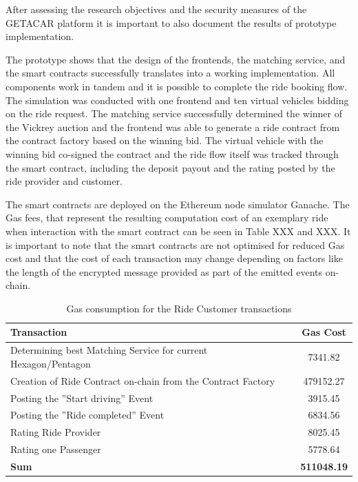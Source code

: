 After assessing  the research objectives and the security measures of the GETACAR platform it is important to also document the results of prototype implementation. 

The prototype shows that the design of the frontends, the matching service, and the smart contracts successfully translates into a working implementation. All components work in tandem and it is possible to complete the ride booking flow. The simulation was conducted with one frontend and ten virtual vehicles bidding on the ride request. The matching service successfully determined the winner of the Vickrey auction and the frontend was able to generate a ride contract from the contract factory based on the winning bid. The virtual vehicle with the winning bid co-signed the contract and the ride flow itself was tracked through the smart contract, including the deposit payout and the rating posted by the ride provider and customer.

The smart contracts are deployed on the Ethereum node simulator Ganache. The Gas fees, that represent the resulting computation cost of an exemplary ride when interaction with the smart contract can be seen in Table XXX and XXX. It is important to note that the smart contracts are not optimised for reduced Gas cost and that the cost of each transaction may change depending on factors like the length of the encrypted message provided as part of the emitted events on-chain.

\begin{table}[H]
\centering
\begin{tabular}{|l|c|}
\hline
\textbf{Transaction} & \textbf{Gas Cost} \\
\hline
Determining best Matching Service for current Hexagon/Pentagon & 7341.82 \\
\hline
Creation of Ride Contract on-chain from the Contract Factory& 479152.27 \\
\hline
Posting the ''Start driving'' Event& 3915.45 \\
\hline
Posting the ''Ride completed'' Event & 6834.56 \\
\hline
Rating Ride Provider & 8025.45 \\
\hline
Rating one Passenger & 5778.64 \\
\hline
\hline
\textbf{Sum}  & \textbf{511048.19} \\
\hline
\end{tabular}
\caption{Gas consumption for the Ride Customer transactions}
\end{table}

